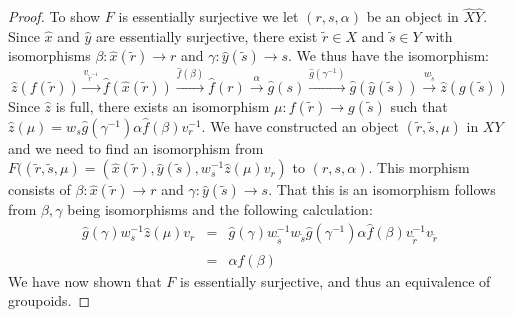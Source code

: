 \documentclass{article}
\renewcommand{\to}{\rightarrow}
\newcommand{\maps}{\colon}
\begin{document}
\begin{proof}
To show $F$ is essentially surjective we let $(r,s,\alpha)$
be an object in $\hat{X}\hat{Y}$.  Since $\hat{x}$ and $\hat{y}$ are
essentially surjective, there exist $\tilde{r} \in X$ and
$\tilde{s}\in Y$ with isomorphisms $\beta \maps
\hat{x}(\tilde{r}) \to r$ and $\gamma \maps \hat{y}(\tilde{s}) \to s$.
We thus have the isomorphism:
\[\hat{z}(f(\tilde{r}))\stackrel{v_{\tilde{r}^{-1}}}\longrightarrow \hat{f}(\hat{x}(\tilde{r}))\stackrel{\hat{f}(\beta)}\longrightarrow \hat{f}(r) \stackrel{\alpha}\longrightarrow \hat{g}(s) \stackrel{\hat{g}(\gamma^{-1})}\longrightarrow \hat{g}(\hat{y}(\tilde{s}))\stackrel{w_{\tilde{s}}}
\longrightarrow \hat{z}(g(\tilde{s}))\]
Since $\hat{z}$ is full, there exists an isomorphism $\mu \maps
f(\tilde{r}) \to g(\tilde{s})$ such that $\hat{z}(\mu) =
w_s\hat{g}(\gamma^{-1})\alpha\hat{f}(\beta)v_r^{-1}$.  We have
constructed an object $(\tilde{r},\tilde{s},\mu)$ in $XY$ and we need
to find an isomorphism from $F((\tilde{r},\tilde{s},\mu) =
(\hat{x}(\tilde{r}), \hat{y}(\tilde{s}),w_s^{-1}\hat{z}(\mu)v_r)$ to
$(r,s,\alpha)$.  This morphism consists of $\beta \maps
\hat{x}(\tilde{r}) \to r$ and $\gamma \maps \hat{y}(\tilde{s}) \to s$.
That this is an isomorphism follows from $\beta,\gamma$ being
isomorphisms and the following calculation:
\begin{eqnarray*}
\hat{g}(\gamma)w_s^{-1}\hat{z}(\mu)v_r &=& \hat{g}(\gamma)w_{\tilde{s}}^{-1}w_{\tilde{s}}\hat{g}(\gamma^{-1})\alpha\hat{f}(\beta)v_{\tilde{r}}^{-1}v_{\tilde{r}}\\
&=& \alpha\hat{f}(\beta)
\end{eqnarray*}
We have now shown that $F$ is essentially surjective, and
thus an equivalence of groupoids.
\end{proof}
\end{document}
